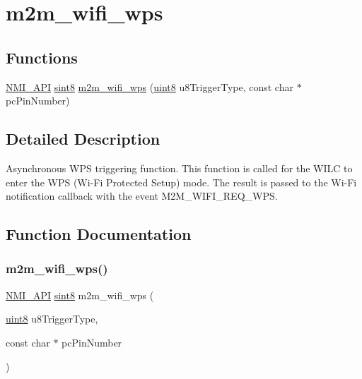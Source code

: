 \hypertarget{group__WifiWpsFn}{}\section{m2m\+\_\+wifi\+\_\+wps}
\label{group__WifiWpsFn}
\subsection*{Functions}
\begin{DoxyCompactItemize}
\item 
\hyperlink{group__BSPDefine_gaecc0323d771e41ef81a76b5f12783e22}{N\+M\+I\+\_\+\+A\+PI} \hyperlink{group__DataT_gae35f10ffd0ac8dd2bc3e794da9bdfbc7}{sint8} \hyperlink{group__WifiWpsFn_ga2130dab81af44784dac78e2ae8c2601c}{m2m\+\_\+wifi\+\_\+wps} (\hyperlink{group__DataT_ga4df709a77647e870bbf1d955b8edc9a6}{uint8} u8\+Trigger\+Type, const char $\ast$pc\+Pin\+Number)
\end{DoxyCompactItemize}


\subsection{Detailed Description}
Asynchronous W\+PS triggering function. This function is called for the W\+I\+LC to enter the W\+PS (Wi-\/\+Fi Protected Setup) mode. The result is passed to the Wi-\/\+Fi notification callback with the event M2\+M\+\_\+\+W\+I\+F\+I\+\_\+\+R\+E\+Q\+\_\+\+W\+PS. 

\subsection{Function Documentation}
\mbox{\label{group__WifiWpsFn_ga2130dab81af44784dac78e2ae8c2601c}} 
\subsubsection{\texorpdfstring{m2m\+\_\+wifi\+\_\+wps()}{m2m\_wifi\_wps()}}
{\footnotesize\ttfamily \hyperlink{group__BSPDefine_gaecc0323d771e41ef81a76b5f12783e22}{N\+M\+I\+\_\+\+A\+PI} \hyperlink{group__DataT_gae35f10ffd0ac8dd2bc3e794da9bdfbc7}{sint8} m2m\+\_\+wifi\+\_\+wps (\begin{DoxyParamCaption}\item[{\hyperlink{group__DataT_ga4df709a77647e870bbf1d955b8edc9a6}{uint8}}]{u8\+Trigger\+Type,  }\item[{const char $\ast$}]{pc\+Pin\+Number }\end{DoxyParamCaption})}




